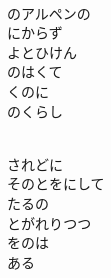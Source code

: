 \documentclass[10pt,b5j]{tarticle} %
\begin{document}
\vspace{1.5em} %
\newcommand{\linespace}{0.5em} %
\newcommand{\blocksize}{0.5\hsize} %
\newcommand{\itemmargin}{3em} %
\begin{enumerate} %
    \setlength{\itemindent}{\itemmargin} %
    \begin{minipage}[c]{\blocksize}
    
        \vspace{\linespace}
        \item~\\
        のアルペンの\\
        にからず\\
        よとひけん\\
        のはくて\\
        くのに\\
        のくらし
        
    \end{minipage}
    \begin{minipage}[c]{\blocksize}
        
        \vspace{\linespace}
        \item~\\
        されどに\\
        そのとをにして\\
        たるの\\
        とがれりつつ\\
        をのは\\
        ある
        
    \end{minipage}
    \begin{minipage}[c]{\blocksize}
        

\end{minipage}
\end{enumerate}
\end{document}
